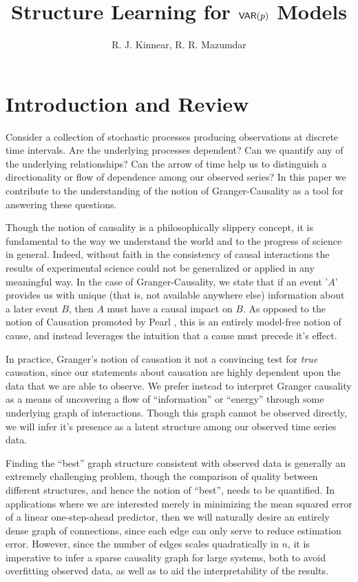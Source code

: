 \documentclass[12pt]{article}
\title{Structure Learning for $\mathsf{VAR}(p)$ Models}
\author{R. J. Kinnear, R. R. Mazumdar}
\begin{document}
\maketitle
{}

\section{Introduction and Review}
\label{sec:introduction}
Consider a collection of stochastic processes producing observations
at discrete time intervals.  Are the underlying processes dependent?
Can we quantify any of the underlying relationships?  Can the arrow of
time help us to distinguish a directionality or flow of dependence
among our observed series?  In this paper we contribute to the
understanding of the notion of Granger-Causality
\cite{granger1969investigating} as a tool for answering these questions.

Though the notion of causality is a philosophically slippery concept,
it is fundamental to the way we understand the world and to the
progress of science in general.  Indeed, without faith in the
consistency of causal interactions the results of experimental science
could not be generalized or applied in any meaningful way.  In the
case of Granger-Causality, we state that if an event '$A$' provides us
with unique (that is, not available anywhere else) information about a
later event $B$, then $A$ must have a causal impact on $B$.  As
opposed to the notion of Causation promoted by Pearl
\cite{pearl2000art}, this is an entirely model-free notion of cause,
and instead leverages the intuition that a cause must precede it's
effect.

In practice, Granger's notion of causation it not a convincing test
for \textit{true} causation, since our statements about causation are
highly dependent upon the data that we are able to observe.  We prefer
instead to interpret Granger causality as a means of uncovering a flow
of ``information'' or ``energy'' through some underlying graph of
interactions.  Though this graph cannot be observed directly, we will
infer it's presence as a latent structure among our observed time
series data.

Finding the ``best'' graph structure consistent with observed data is
generally an extremely challenging problem, though the comparison of
quality between different structures, and hence the notion of
``best'', needs to be quantified.  In applications where we are
interested merely in minimizing the mean squared error of a linear
one-step-ahead predictor, then we will naturally desire an entirely
dense graph of connections, since each edge can only serve to reduce
estimation error.  However, since the number of edges scales
quadratically in $n$, it is imperative to infer a sparse causality
graph for large systems, both to avoid overfitting observed data, as
well as to aid the interpretability of the results.
\end{document}
